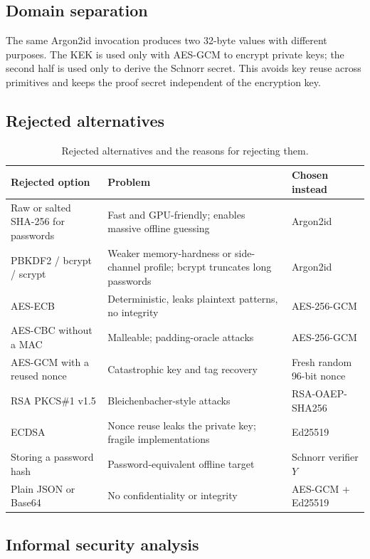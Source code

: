 \documentclass[11pt,a4paper]{article}
\begin{document}
\subsection{Domain separation}

The same Argon2id invocation produces two 32-byte values with different
purposes. The KEK is used only with AES-GCM to encrypt private keys; the second
half is used only to derive the Schnorr secret. This avoids key reuse across
primitives and keeps the proof secret independent of the encryption key.

\subsection{Rejected alternatives}

\begin{table}[htbp]
\centering
\small
\begin{tabular}{@{}p{4.1cm}p{5.3cm}p{5.0cm}@{}}
\toprule
\textbf{Rejected option} & \textbf{Problem} & \textbf{Chosen instead} \\
\midrule
Raw or salted SHA-256 for passwords & Fast and GPU-friendly; enables massive offline guessing & Argon2id \\
PBKDF2 / bcrypt / scrypt & Weaker memory-hardness or side-channel profile; bcrypt truncates long passwords & Argon2id \\
AES-ECB & Deterministic, leaks plaintext patterns, no integrity & AES-256-GCM \\
AES-CBC without a MAC & Malleable; padding-oracle attacks & AES-256-GCM \\
AES-GCM with a reused nonce & Catastrophic key and tag recovery & Fresh random 96-bit nonce \\
RSA PKCS\#1 v1.5 & Bleichenbacher-style attacks & RSA-OAEP-SHA256 \\
ECDSA & Nonce reuse leaks the private key; fragile implementations & Ed25519 \\
Storing a password hash & Password-equivalent offline target & Schnorr verifier $Y$ \\
Plain JSON or Base64 & No confidentiality or integrity & AES-GCM + Ed25519 \\
\bottomrule
\end{tabular}
\caption{Rejected alternatives and the reasons for rejecting them.}
\label{tab:rejected}
\end{table}

\subsection{Informal security analysis}
\end{document}
